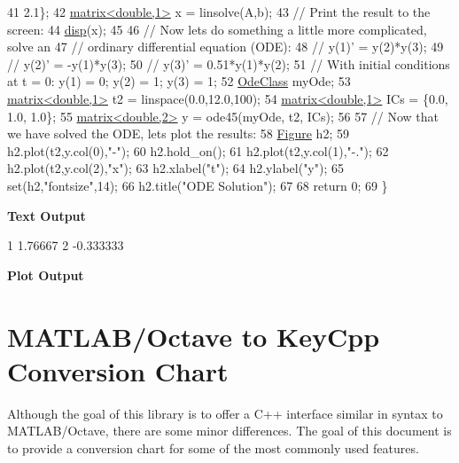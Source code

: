 \begin{DoxyCodeInclude}
41                           2.1\};
42     \hyperlink{classkeycpp_1_1matrix}{matrix<double,1>} x = linsolve(A,b);
43     \textcolor{comment}{// Print the result to the screen:}
44     \hyperlink{namespacekeycpp_af4a2245da139cf6cf2e03426476b3b88}{disp}(x);
45 
46     \textcolor{comment}{// Now lets do something a little more complicated, solve an}
47     \textcolor{comment}{// ordinary differential equation (ODE):}
48     \textcolor{comment}{// y(1)' = y(2)*y(3);}
49     \textcolor{comment}{// y(2)' = -y(1)*y(3);}
50     \textcolor{comment}{// y(3)' = 0.51*y(1)*y(2);}
51     \textcolor{comment}{// With initial conditions at t = 0: y(1) = 0; y(2) = 1; y(3) = 1;}
52     \hyperlink{class_ode_class}{OdeClass} myOde;
53     \hyperlink{classkeycpp_1_1matrix}{matrix<double,1>} t2 = linspace(0.0,12.0,100);
54     \hyperlink{classkeycpp_1_1matrix}{matrix<double,1>} ICs = \{0.0, 1.0, 1.0\};
55     \hyperlink{classkeycpp_1_1matrix}{matrix<double,2>} y = ode45(myOde, t2, ICs);
56     
57     \textcolor{comment}{// Now that we have solved the ODE, lets plot the results:}
58     \hyperlink{classkeycpp_1_1_figure}{Figure} h2;
59     h2.plot(t2,y.col(0),\textcolor{stringliteral}{"-"});
60     h2.hold\_on();
61     h2.plot(t2,y.col(1),\textcolor{stringliteral}{"-."});
62     h2.plot(t2,y.col(2),\textcolor{stringliteral}{"x"});
63     h2.xlabel(\textcolor{stringliteral}{"t"});
64     h2.ylabel(\textcolor{stringliteral}{"y"});
65     \textcolor{keyword}{set}(h2,\textcolor{stringliteral}{"fontsize"},14);
66     h2.title(\textcolor{stringliteral}{"ODE Solution"});
67     
68     \textcolor{keywordflow}{return} 0;
69 \}
\end{DoxyCodeInclude}
 \par
 \label{_output}%
 {\bfseries {\ttfamily Text} Output} 
\begin{DoxyCodeInclude}
1 1.76667
2 -0.333333
\end{DoxyCodeInclude}
 \par
 {\bfseries {\ttfamily Plot} Output}  \par
  \par


\section*{M\-A\-T\-L\-A\-B/\-Octave to Key\-Cpp Conversion Chart}

Although the goal of this library is to offer a C++ interface similar in syntax to M\-A\-T\-L\-A\-B/\-Octave, there are some minor differences. The goal of this document is to provide a conversion chart for some of the most commonly used features.

